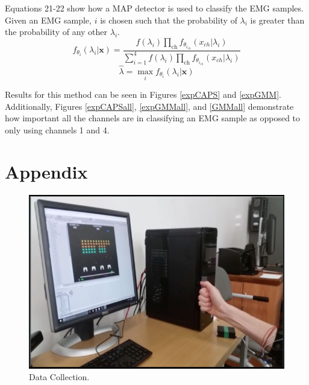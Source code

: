 \documentclass[times, 10pt,twocolumn]{article}
\begin{document}
Equations 21-22 show how a MAP detector is used to classify the EMG samples. Given an EMG sample, $i$ is chosen such that the probability of $\lambda_i$ is greater than the probability of any other $\lambda_i$.
\begin{equation}
f_{\theta_i}(\lambda_i|\mathbf{x}) = \frac{f(\lambda_i)\prod_{\text{ch}}f_{\theta_{i_{ch}}}(x_{ch}|\lambda_i)}{\sum_{i=1}^{4}f(\lambda_i)\prod_{\text{ch}}f_{\theta_{i_{ch}}}(x_{ch}|\lambda_i)}
\end{equation}
\begin{equation}
\hat{\lambda} = \max_{i}f_{\theta_i}(\lambda_i|\mathbf{x})
\end{equation}

Results for this method can be seen in Figures \ref{expCAPS} and \ref{expGMM}. Additionally, Figures \ref{expCAPSall}, \ref{expGMMall}, and \ref{GMMall} demonstrate how important all the channels are in classifying an EMG sample as opposed to only using channels 1 and 4.

%
%
%
%
%

\section*{Appendix}

\begin{figure}[h]
  \includegraphics[width=\linewidth]{Figures/f1.png}
  \caption{Data Collection.}
  \label{data_collection}
\end{figure}
\end{document}
